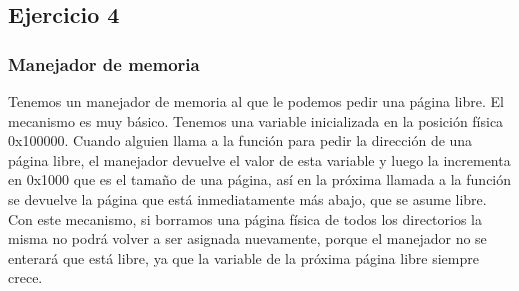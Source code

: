 \subsection{Ejercicio 4}

\subsubsection{Manejador de memoria}
Tenemos un manejador de memoria al que le podemos pedir una página libre. El mecanismo es muy básico. Tenemos una variable inicializada en la posición física 0x100000. Cuando alguien llama a la función para pedir la dirección de una página libre, el manejador devuelve el valor de esta variable y luego la incrementa en 0x1000 que es el tamaño de una página, así en la próxima llamada a la función se devuelve la página que está inmediatamente más abajo, que se asume libre.\newline
Con este mecanismo, si borramos una página física de todos los directorios la misma no podrá volver a ser asignada nuevamente, porque el manejador no se enterará que está libre, ya que la variable de la próxima página libre siempre crece.

